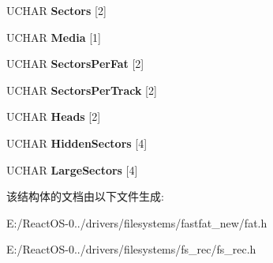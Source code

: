 \begin{DoxyCompactItemize}
U\+C\+H\+AR {\bfseries Sectors} \mbox{[}2\mbox{]}
\item 
\mbox{\label{struct___p_a_c_k_e_d___b_i_o_s___p_a_r_a_m_e_t_e_r___b_l_o_c_k_a1e0f0405b6bfc0df6bd07044be8e0258}} 
U\+C\+H\+AR {\bfseries Media} \mbox{[}1\mbox{]}
\item 
\mbox{\label{struct___p_a_c_k_e_d___b_i_o_s___p_a_r_a_m_e_t_e_r___b_l_o_c_k_a1a0d4d37710d78197629a682f8a0a1b8}} 
U\+C\+H\+AR {\bfseries Sectors\+Per\+Fat} \mbox{[}2\mbox{]}
\item 
\mbox{\label{struct___p_a_c_k_e_d___b_i_o_s___p_a_r_a_m_e_t_e_r___b_l_o_c_k_a99b0b77bee78831b2d1e7fd93929d4e9}} 
U\+C\+H\+AR {\bfseries Sectors\+Per\+Track} \mbox{[}2\mbox{]}
\item 
\mbox{\label{struct___p_a_c_k_e_d___b_i_o_s___p_a_r_a_m_e_t_e_r___b_l_o_c_k_aa872a73b51cbaac5d2fa63f8f537a79c}} 
U\+C\+H\+AR {\bfseries Heads} \mbox{[}2\mbox{]}
\item 
\mbox{\label{struct___p_a_c_k_e_d___b_i_o_s___p_a_r_a_m_e_t_e_r___b_l_o_c_k_ab1e43fa6966e63f7f6633d99c7280459}} 
U\+C\+H\+AR {\bfseries Hidden\+Sectors} \mbox{[}4\mbox{]}
\item 
\mbox{\label{struct___p_a_c_k_e_d___b_i_o_s___p_a_r_a_m_e_t_e_r___b_l_o_c_k_a77c2aa953810e9f54a73cf4f5c6e05d3}} 
U\+C\+H\+AR {\bfseries Large\+Sectors} \mbox{[}4\mbox{]}
\end{DoxyCompactItemize}


该结构体的文档由以下文件生成\+:\begin{DoxyCompactItemize}
\item 
E\+:/\+React\+O\+S-\/0../drivers/filesystems/fastfat\+\_\+new/fat.\+h\item 
E\+:/\+React\+O\+S-\/0../drivers/filesystems/fs\+\_\+rec/fs\+\_\+rec.\+h\end{DoxyCompactItemize}
